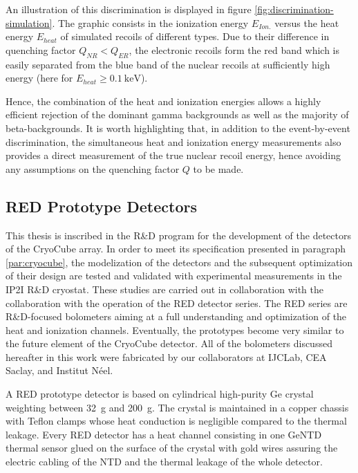 An illustration of this discrimination is displayed in figure \ref{fig:discrimination-simulation}. The graphic consists in the ionization energy $E_{Ion.}$ versus the heat energy $E_{heat}$ of simulated recoils of different types. Due to their difference in quenching factor $Q_{NR} < Q_{ER}$, the electronic recoils form the red band which is easily separated from the blue band of the nuclear recoils at sufficiently high energy (here for $E_{heat} \geq \SI{0.1}{\kilo\eV}$).  

Hence, the combination of the heat and ionization energies allows a highly efficient rejection of the dominant gamma backgrounds as well as the majority of beta-backgrounds. It is worth highlighting  that, in addition to the event-by-event discrimination, the simultaneous heat and ionization energy measurements also provides a direct measurement of the true nuclear recoil energy, hence avoiding any assumptions on the quenching factor $Q$ to be made. 




\subsection{RED Prototype Detectors}

This thesis is inscribed in the R\&D program for the development of the detectors of the CryoCube array. In order to meet its specification presented in paragraph \ref{par:cryocube}, the modelization of the detectors and the subsequent optimization of their design are tested and validated with experimental measurements in the IP2I R\&D cryostat.
These studies are carried out in collaboration with the \Edelweiss{} collaboration with the operation of the RED detector series. The RED series are R\&D-focused bolometers aiming at a full understanding and optimization of the heat and ionization channels. Eventually, the prototypes become very similar to the future element of the CryoCube detector. All of the bolometers discussed hereafter in this work were fabricated by our collaborators at IJCLab, CEA Saclay, and Institut Néel. 

A RED prototype detector is based on cylindrical high-purity Ge crystal weighting between \SI{32}{\g} and \SI{200}{\g}. The crystal is maintained in a copper chassis with Teflon clamps whose heat conduction is negligible compared to the thermal leakage. Every RED detector has a heat channel consisting in one GeNTD thermal sensor glued on the surface of the crystal with gold wires assuring the electric cabling of the NTD and the thermal leakage of the whole detector. 

